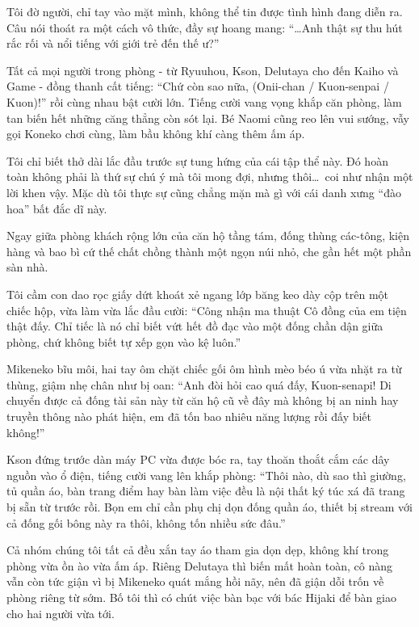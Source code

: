 ﻿\documentclass[../main.tex]{subfiles}
\begin{document}
Tôi đờ người, chỉ tay vào mặt mình, không thể tin được tình hình đang diễn ra. Câu nói thoát ra một cách vô thức, đầy sự hoang mang: ``\dots Anh thật sự thu hút rắc rối và nổi tiếng với giới trẻ đến thế ư?''

Tất cả mọi người trong phòng - từ Ryuuhou, Kson, Delutaya cho đến Kaiho và Game - đồng thanh cất tiếng: ``Chứ còn sao nữa, (Onii-chan / Kuon-senpai / Kuon)!'' rồi cùng nhau bật cười lớn. Tiếng cười vang vọng khắp căn phòng, làm tan biến hết những căng thẳng còn sót lại. Bé Naomi cũng reo lên vui sướng, vẫy gọi Koneko chơi cùng, làm bầu không khí càng thêm ấm áp.

Tôi chỉ biết thở dài lắc đầu trước sự tung hứng của cái tập thể này. Đó hoàn toàn không phải là thứ sự chú ý mà tôi mong đợi, nhưng thôi\dots\ coi như nhận một lời khen vậy. Mặc dù tôi thực sự cũng chẳng mặn mà gì với cái danh xưng ``đào hoa'' bất đắc dĩ này.

\omk

Ngay giữa phòng khách rộng lớn của căn hộ tầng tám, đống thùng các-tông, kiện hàng và bao bì cứ thế chất chồng thành một ngọn núi nhỏ, che gần hết một phần sàn nhà.

Tôi cầm con dao rọc giấy dứt khoát xẻ ngang lớp băng keo dày cộp trên một chiếc hộp, vừa làm vừa lắc đầu cười: ``Công nhận ma thuật Cô đồng của em tiện thật đấy. Chỉ tiếc là nó chỉ biết vứt hết đồ đạc vào một đống chần dận giữa phòng, chứ không biết tự xếp gọn vào kệ luôn.''

Mikeneko bĩu môi, hai tay ôm chặt chiếc gối ôm hình mèo béo ú vừa nhặt ra từ thùng, giậm nhẹ chân như bị oan: ``Anh đòi hỏi cao quá đấy, Kuon-senapi! Di chuyển được cả đống tài sản này từ căn hộ cũ về đây mà không bị an ninh hay truyền thông nào phát hiện, em đã tốn bao nhiêu năng lượng rồi đấy biết không!''

Kson đứng trước dàn máy PC vừa được bóc ra, tay thoăn thoắt cắm các dây nguồn vào ổ điện, tiếng cười vang lên khắp phòng: ``Thôi nào, dù sao thì giường, tủ quần áo, bàn trang điểm hay bàn làm việc đều là nội thất ký túc xá đã trang bị sẵn từ trước rồi. Bọn em chỉ cần phụ chị dọn đống quần áo, thiết bị stream với cả đống gối bông này ra thôi, không tốn nhiều sức đâu.''

Cả nhóm chúng tôi tất cả đều xắn tay áo tham gia dọn dẹp, không khí trong phòng vừa ồn ào vừa ấm áp. Riêng Delutaya thì biến mất hoàn toàn, cô nàng vẫn còn tức giận vì bị Mikeneko quát mắng hồi nãy, nên đã giận dỗi trốn về phòng riêng từ sớm. Bố tôi thì có chút việc bàn bạc với bác Hijaki để bàn giao cho hai người vừa tới.
\end{document}

